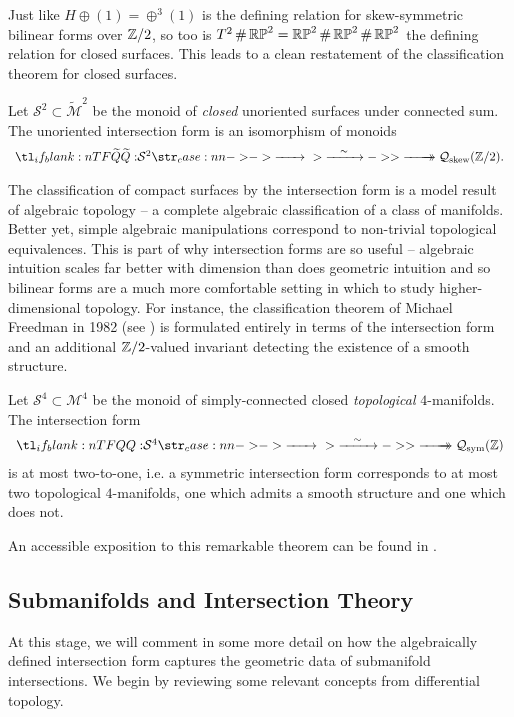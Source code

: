Just like $H\oplus (1)= \oplus^3 (1)$ is the defining relation for skew-symmetric bilinear forms over $\mathbb{Z}/2$, so too is $T^2\+ \RP^2 = \RP^2\+\RP^2\+\RP^2$ the defining relation for closed surfaces. This leads to a clean restatement of the classification theorem for closed surfaces.

\begin{theorem}
	Let $\mathcal{S}^2\subset \widetilde{\mathcal{M}}^2$ be the monoid of \textit{closed} unoriented surfaces under connected sum. The unoriented intersection form is an isomorphism of monoids
	\[
		\lkxfunc{\widetilde{Q}}{\mathcal{S}^2}{\mathcal{Q}_{\mathrm{skew}}(\Z/2).}
	\]
\end{theorem}

The classification of compact surfaces by the intersection form is a model result of algebraic topology -- a complete algebraic classification of a class of manifolds. Better yet, simple algebraic manipulations correspond to non-trivial topological equivalences. This is part of why intersection forms are so useful -- algebraic intuition scales far better with dimension than does geometric intuition and so bilinear forms are a much more comfortable setting in which to study higher-dimensional topology. For instance, the classification theorem of Michael Freedman in 1982 (see \cite{freedman1982manifold}) is formulated entirely in terms of the intersection form and an additional $\mathbb{Z}/2$-valued invariant detecting the existence of a smooth structure.

\begin{theorem}[Freedman, 1982] Let $\mathcal{S}^4\subset \mathcal{M}^4$ be the monoid of simply-connected closed \emph{topological} $4$-manifolds. The intersection form
	\[
		\lkxfunc{Q}{\mathcal{S}^4}{\mathcal{Q}_{\mathrm{sym}}(\Z)}
	\]
	is at most two-to-one, i.e. a symmetric intersection form corresponds to at most two topological $4$-manifolds, one which admits a smooth structure and one which does not.
\end{theorem}

An accessible exposition to this remarkable theorem can be found in \cite{behrens2021discembedding}.

\subsection{Submanifolds and Intersection Theory}\label{sec:submanifolds-intersection-theory}

At this stage, we will comment in some more detail on how the algebraically defined intersection form captures the geometric data of submanifold intersections. We begin by reviewing some relevant concepts from differential topology.

